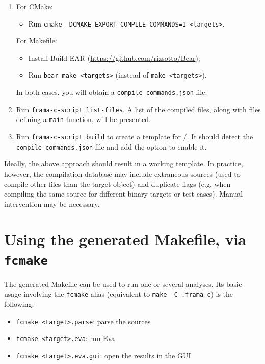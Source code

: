 \begin{enumerate}
\item For CMake:
  \begin{itemize}
  \item Run \texttt{cmake -DCMAKE\_EXPORT\_COMPILE\_COMMANDS=1 <targets>}.
  \end{itemize}
  For Makefile:
  \begin{itemize}
  \item Install Build EAR (\url{https://github.com/rizsotto/Bear});
  \item Run \texttt{bear~make~<targets>} (instead of \texttt{make <targets>}).
  \end{itemize}
  In both cases, you will obtain a \texttt{compile\_commands.json} file.
\item Run \texttt{frama-c-script list-files}. A list of the compiled files,
  along with files defining a \texttt{main} function, will be presented.
\item Run \texttt{frama-c-script build} to create a template for
  \FramaC/\Value. It should detect the \texttt{compile\_commands.json} file
  and add the option to enable it.
\end{enumerate}

Ideally, the above approach should result in a working template. In practice,
however, the compilation database may include extraneous sources
(used to compile other files than the target object) and duplicate flags
(e.g. when compiling the same source for different binary targets or test
cases). Manual intervention may be necessary.

\section{Using the generated Makefile, via \texttt{fcmake}}
\label{sec:using-generated-makefile}

The generated Makefile can be used to run one or several analyses.
Its basic usage involving the \texttt{fcmake} alias (equivalent to
\texttt{make -C .frama-c}) is the following:

\begin{itemize}
\item \texttt{fcmake <target>.parse}: parse the sources
\item \texttt{fcmake <target>.eva}: run Eva
\item \texttt{fcmake <target>.eva.gui}: open the results in the GUI
\end{itemize}

